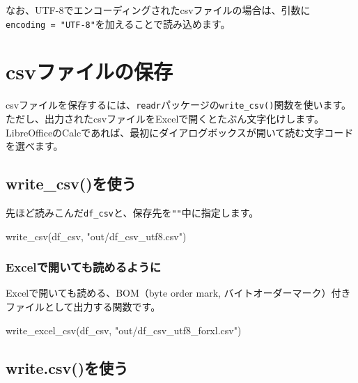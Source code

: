 \documentclass[
  xelatex,ja=standard, b5paper]{bxjsbook}
\newenvironment{Shaded}{\begin{snugshade}}{\end{snugshade}}
\newcommand{\FunctionTok}[1]{\textcolor[rgb]{0.00,0.00,0.00}{#1}}
\newcommand{\NormalTok}[1]{#1}
\newcommand{\StringTok}[1]{\textcolor[rgb]{0.31,0.60,0.02}{#1}}
\begin{document}
なお、UTF-8でエンコーディングされたcsvファイルの場合は、引数に\texttt{encoding\ =\ "UTF-8"}を加えることで読み込めます。

\hypertarget{writeonecsv}{%
\section{csvファイルの保存}\label{writeonecsv}}

csvファイルを保存するには、\texttt{readr}パッケージの\texttt{write\_csv()}関数を使います。ただし、出力されたcsvファイルをExcelで開くとたぶん文字化けします。LibreOfficeのCalcであれば、最初にダイアログボックスが開いて読む文字コードを選べます。

\hypertarget{write_csvux3092ux4f7fux3046}{%
\subsection{write\_csv()を使う}\label{write_csvux3092ux4f7fux3046}}

先ほど読みこんだ\texttt{df\_csv}と、保存先を\texttt{""}中に指定します。

\begin{Shaded}
\begin{Highlighting}[]
\FunctionTok{write\_csv}\NormalTok{(df\_csv, }\StringTok{"out/df\_csv\_utf8.csv"}\NormalTok{)}
\end{Highlighting}
\end{Shaded}

\newpage

\hypertarget{excelux3067ux958bux3044ux3066ux3082ux8aadux3081ux308bux3088ux3046ux306b}{%
\subsubsection{Excelで開いても読めるように}\label{excelux3067ux958bux3044ux3066ux3082ux8aadux3081ux308bux3088ux3046ux306b}}

Excelで開いても読める、BOM（byte order mark, バイトオーダーマーク）付きファイルとして出力する関数です。

\begin{Shaded}
\begin{Highlighting}[]
\FunctionTok{write\_excel\_csv}\NormalTok{(df\_csv, }\StringTok{"out/df\_csv\_utf8\_forxl.csv"}\NormalTok{)}
\end{Highlighting}
\end{Shaded}

\hypertarget{write.csvux3092ux4f7fux3046}{%
\subsection{write.csv()を使う}\label{write.csvux3092ux4f7fux3046}}
\end{document}
